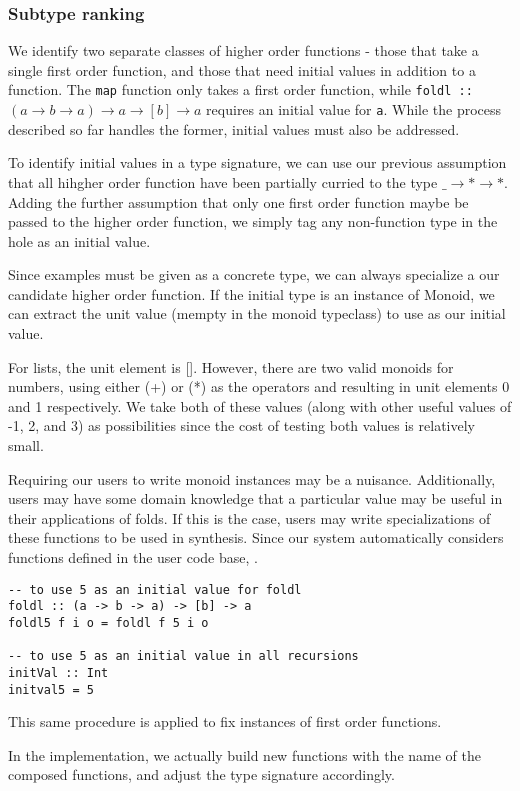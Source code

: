 \subsubsection{Subtype ranking}
We identify two separate classes of higher order functions - those that take a single first order function, and those that need initial values in addition to a function. The \texttt{map} function only takes a first order function, while \texttt{foldl :: $(a\to b\to a)\to a\to [b]\to a$} requires an initial value for \texttt{a}. While the process described so far handles the former, initial values must also be addressed.

To identify initial values in a type signature, we can use our previous assumption that all hihgher order function have been partially curried to the type \texttt{$\_\to *\to*$}. Adding the further assumption that only one first order function maybe be passed to the higher order function, we simply tag any non-function type in the hole as an initial value. 

Since examples must be given as a concrete type, we can always specialize a our candidate higher order function. If the initial type is an instance of Monoid, we can extract the unit value (mempty in the monoid typeclass) to use as our initial value. 

For lists, the unit element is []. However, there are two valid monoids for numbers, using either (+) or (*) as the operators and resulting in unit elements 0 and 1 respectively. We take both of these values (along with other useful values of -1, 2, and 3) as possibilities since the cost of testing both values is relatively small.

Requiring our users to write monoid instances may be a nuisance. Additionally, users may have some domain knowledge that a particular value may be useful in their applications of folds. If this is the case, users may write specializations of these functions to be used in synthesis. Since our system automatically considers functions defined in the user code base, .

\begin{lstlisting}
-- to use 5 as an initial value for foldl
foldl :: (a -> b -> a) -> [b] -> a
foldl5 f i o = foldl f 5 i o

-- to use 5 as an initial value in all recursions
initVal :: Int
initval5 = 5
\end{lstlisting}

This same procedure is applied to fix instances of first order functions.

In the implementation, we actually build new functions with the name of the composed functions, and adjust the type signature accordingly.


